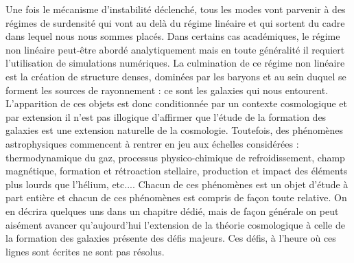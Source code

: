 Une fois le mécanisme d'instabilité déclenché, tous les modes vont parvenir à des régimes de surdensité qui vont au delà du régime linéaire et qui sortent du cadre dans lequel nous nous sommes placés. Dans certains cas académiques, le régime non linéaire peut-être abordé analytiquement mais en toute généralité il requiert l'utilisation de simulations numériques. La culmination de ce régime non linéaire est la création de structure denses, dominées par les baryons et au sein duquel se forment les sources de rayonnement : ce sont les galaxies qui nous entourent. L'apparition de ces objets est donc conditionnée par un contexte cosmologique et par extension il n'est pas illogique d'affirmer que l'étude de la formation des galaxies est une extension naturelle de la cosmologie. Toutefois, des phénomènes astrophysiques commencent à rentrer en jeu aux échelles considérées : thermodynamique du gaz, processus physico-chimique de refroidissement, champ magnétique, formation et rétroaction stellaire, production et impact des éléments plus lourds que l'hélium, etc.... Chacun de ces phénomènes est un objet d'étude à part entière et chacun de ces phénomènes est compris de façon toute relative. On en décrira quelques uns dans un chapitre dédié, mais de façon générale on peut aisément avancer qu'aujourd'hui l'extension de la théorie cosmologique à celle de la formation des galaxies présente des défis majeurs. Ces défis, à l'heure où ces lignes sont écrites ne sont pas résolus.

